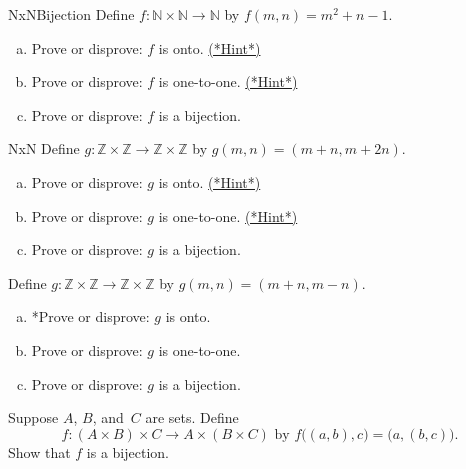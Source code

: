  
 \begin{exercise}{NxNBijection} 
 Define $f \colon \mathbb{N} \times \mathbb{N} \to \mathbb{N}$ by $f(m,n) = m^2 + n - 1$. 
 \begin{enumerate}[(a)]
 \item \label{NxNBijection-m2+n-onto}  
 Prove or disprove: $f$ is onto.
 \hyperref[sec:functions:hints]{(*Hint*)}
 \item \label{NxNBijection-m2+n-not11}  
Prove or disprove: $f$ is one-to-one.
 \hyperref[sec:functions:hints]{(*Hint*)}
\item
Prove or disprove:  $f$ is a bijection.
 \end{enumerate}
\end{exercise}

\begin{exercise}{NxN}
Define $g \colon \mathbb{Z} \times \mathbb{Z} \to \mathbb{Z} \times \mathbb{Z}$ by $g(m,n) = (m + n, m + 2n)$. 
 \begin{enumerate}[(a)]
 \item  \label{NxNBijection-mpmn-notonto1}  
Prove or disprove: $g$ is onto.
\hyperref[sec:functions:hints]{(*Hint*)} 
 \item  \label{NxNBijection-mpmn-111}  
Prove or disprove: $g$ is one-to-one.
\hyperref[sec:functions:hints]{(*Hint*)}
\item
Prove or disprove: $g$ is a bijection.
 \end{enumerate}
\end{exercise}

\begin{exercise}{}
Define $g \colon \mathbb{Z} \times \mathbb{Z} \to \mathbb{Z} \times \mathbb{Z}$ by $g(m,n) = (m + n, m - n)$. 
 \begin{enumerate}[(a)]
 \item  \label{NxNBijection-mpmn-notonto}  
*Prove or disprove: $g$ is  onto.
 \item  \label{NxNBijection-mpmn-11}  
Prove or disprove: $g$ is one-to-one.
\item
Prove or disprove: $g$ is a bijection.
 \end{enumerate}
\end{exercise}


\begin{exercise}{} \label{AxBxCBijectionEx}
Suppose $A$, $B$, and~$C$ are sets. Define 
\[
 f \colon (A \times B) \times C \to A \times (B \times C)  \text{ by } 
f\bigl( (a,b),c \bigr) = \bigl( a,(b, c) \bigr).\]
Show that $f$ is a bijection.
\end{exercise}

